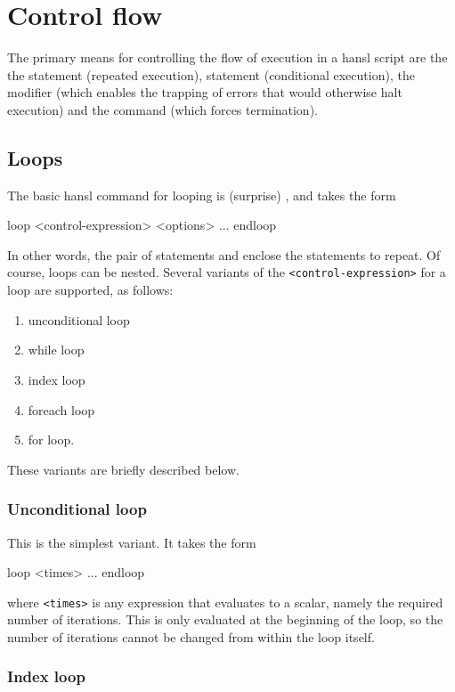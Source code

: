 \chapter{Control flow}
\label{chap:hp-ctrlflow}

The primary means for controlling the flow of execution in a hansl
script are the the  statement (repeated execution), 
statement (conditional execution), the  modifier (which
enables the trapping of errors that would otherwise halt execution)
and the  command (which forces termination).

\section{Loops}
\label{sec:hr-loops}

The basic hansl command for looping is (surprise) , and
takes the form
\begin{code}
loop <control-expression> <options>
    ...
endloop
\end{code}
In other words, the pair of statements  and 
enclose the statements to repeat. Of course, loops can be nested.
Several variants of the \texttt{<control-expression>} for a loop are
supported, as follows:
\begin{enumerate}
\item unconditional loop
\item while loop
\item index loop
\item foreach loop
\item for loop.
\end{enumerate}
These variants are briefly described below.

\subsection{Unconditional loop}

This is the simplest variant. It takes the form
\begin{code}
loop <times>
   ...
endloop
\end{code}
where \texttt{<times>} is any expression that evaluates to a scalar,
namely the required number of iterations. This is only evaluated at
the beginning of the loop, so the number of iterations cannot be
changed from within the loop itself.

\subsection{Index loop}

